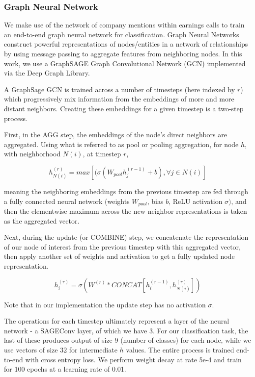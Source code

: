 \documentclass{article}[11pt]
\begin{document}
    \subsubsection*{Graph Neural Network}

    We make use of the network of company mentions within earnings calls to train an end-to-end graph neural network for classification. Graph Neural Networks construct powerful representations of nodes/entities in a network of relationships by using message passing to aggregate features from neighboring nodes. In this work, we use a GraphSAGE \citep{hamilton_inductive_2018} Graph Convolutional Network (GCN) implemented via the Deep Graph Library. \citep{deep_graph_library_deep_2024}


    A GraphSage GCN is trained across a number of timesteps (here indexed by $r$) which progressively mix information from the embeddings of more and more distant neighbors. Creating these embeddings for a given timestep is a two-step process.

    First, in the AGG step, the embeddings of the node's direct neighbors are aggregated. Using what is referred to as pool or pooling aggregation, for node $h$, with neighborhood $N(i)$, at timestep $r$,

    \[
    h_{N(i)}^{(r)}=max[(\sigma(W_{pool}h_{j}^{(r-1)}+b),\forall j\in N(i)]
    \]

    meaning the neighboring embeddings from the previous timestep are fed through a fully connected neural network (weights $W_{pool}$, bias $b$, ReLU activation $\sigma)$, and then the elementwise maximum across the new neighbor representations is taken as the aggregated vector.

    Next, during the update (or COMBINE) step, we concatenate the representation of our node of interest from the previous timestep with this aggregated vector, then apply another set of weights and activation to get a fully updated node representation.

    \[
    h_{i}^{(r)}=\sigma(W^{(r)}*CONCAT[h_{i}^{(r-1)},h_{N(i)}^{(r)}])
    \]

    Note that in our implementation the update step has no activation $\sigma$.

    The operations for each timestep ultimately represent a layer of the neural network - a SAGEConv layer, of which we have 3. For our classification task, the last of these produces output of size 9 (number of classes) for each node, while we use vectors of size 32 for intermediate $h$ values. The entire process is trained end-to-end with cross entropy loss. We perform weight decay at rate 5e-4 and train for 100 epochs at a learning rate of 0.01.
\end{document}
